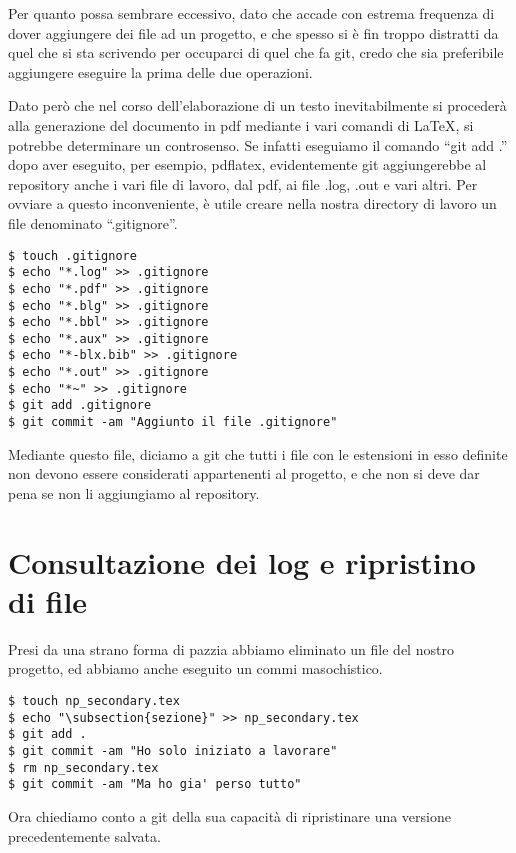 \documentclass{article}
\begin{document}
Per quanto possa sembrare eccessivo, dato che accade con estrema frequenza di
dover aggiungere dei file ad un progetto, e che spesso si è fin troppo
distratti da quel che si sta scrivendo per occuparci di quel che fa git, credo
che sia preferibile aggiungere eseguire la prima delle due operazioni.

Dato però che nel corso dell'elaborazione di un testo inevitabilmente si
procederà alla generazione del documento in pdf mediante i vari comandi di
\LaTeX, si potrebbe determinare un controsenso. Se infatti eseguiamo il comando
``git add .'' dopo aver eseguito,
per esempio, pdflatex, evidentemente git aggiungerebbe al repository anche i
vari file di lavoro, dal pdf, ai file .log, .out e vari altri.
Per ovviare a questo inconveniente, è utile creare nella nostra directory di
lavoro un file denominato ``.gitignore''.

\begin{lstlisting}
$ touch .gitignore
$ echo "*.log" >> .gitignore
$ echo "*.pdf" >> .gitignore
$ echo "*.blg" >> .gitignore
$ echo "*.bbl" >> .gitignore
$ echo "*.aux" >> .gitignore
$ echo "*-blx.bib" >> .gitignore
$ echo "*.out" >> .gitignore
$ echo "*~" >> .gitignore
$ git add .gitignore
$ git commit -am "Aggiunto il file .gitignore"
\end{lstlisting}

Mediante questo file, diciamo a git che tutti i file con le estensioni in esso
definite non devono essere considerati appartenenti al progetto, e che non si
deve dar pena se non li aggiungiamo al repository.

\section{Consultazione dei log e ripristino di file}
Presi da una strano forma di pazzia abbiamo eliminato un file del nostro
progetto, ed abbiamo anche eseguito un commi masochistico.

\begin{lstlisting}
$ touch np_secondary.tex
$ echo "\subsection{sezione}" >> np_secondary.tex
$ git add .
$ git commit -am "Ho solo iniziato a lavorare"
$ rm np_secondary.tex
$ git commit -am "Ma ho gia' perso tutto"
\end{lstlisting}

Ora chiediamo conto a git della sua capacità di ripristinare una versione
precedentemente salvata.
\end{document}
